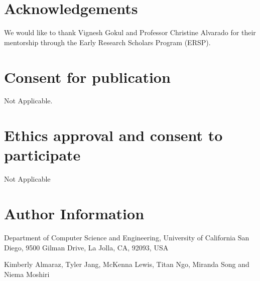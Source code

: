 \documentclass[twocolumn]{bmcart}%
\begin{document}
\begin{backmatter}
\section*{Acknowledgements}
We would like to thank Vignesh Gokul and Professor Christine Alvarado for their mentorship through the Early Research Scholars Program (ERSP).

\section*{Consent for publication}
Not Applicable.
    
\section*{Ethics approval and consent to participate}
Not Applicable

\section*{Author Information}
    Department of Computer Science and Engineering, University of California San Diego, 9500 Gilman Drive, La Jolla, CA, 92093, USA
    
    Kimberly Almaraz, Tyler Jang, McKenna Lewis, Titan Ngo, Miranda Song and Niema Moshiri
    



\end{backmatter}
\end{document}
